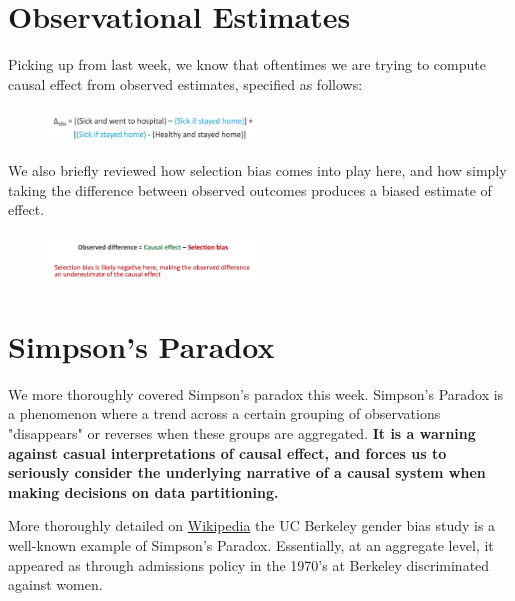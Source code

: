 
\section{Observational Estimates}
Picking up from last week, we know that oftentimes we are trying to compute causal effect from observed estimates, specified as follows: 

\begin{figure}[ht]
  \begin{center}
    \includegraphics[width=0.5\textwidth]{figures/est.png}
  \end{center}
\end{figure}

We also briefly reviewed how selection bias comes into play here, and how simply taking the difference between observed outcomes produces a biased estimate of effect.

\begin{figure}[ht]
  \begin{center}
    \includegraphics[width=0.5\textwidth]{figures/est2.png}
  \end{center}
\end{figure}

\section{Simpson's Paradox}
We more thoroughly covered Simpson's paradox this week. Simpson's Paradox is a phenomenon where a trend across a certain grouping of observations "disappears" or reverses when these groups are aggregated. \textbf{It is a warning against casual interpretations of causal effect, and forces us to seriously consider the underlying narrative of a causal system when making decisions on data partitioning.}

More thoroughly detailed on \href{https://en.wikipedia.org/wiki/Simpson\%27s_paradox}{Wikipedia} the UC Berkeley gender bias study is a well-known example of Simpson's Paradox. Essentially, at an aggregate level, it appeared as through admissions policy in the 1970's at Berkeley discriminated against women. 

